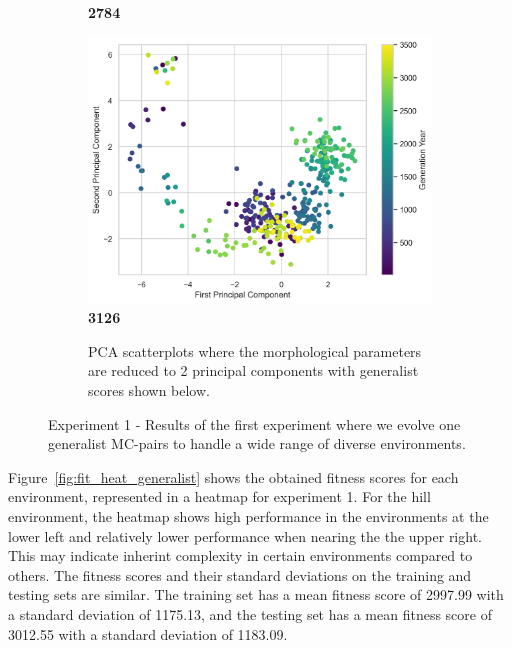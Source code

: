 \begin{figure}[!ht]
\begin{subfigure}{\textwidth}
\begin{minipage}{0.32\textwidth}
                    \textbf{2784}
                \end{minipage}
                \hfill
                \begin{minipage}{0.32\textwidth}
                    \includegraphics[width=\textwidth]{./resources/generalist_5_3126/pca_scatterplot.png}
                    \centering
                    \textbf{3126}
                \end{minipage}
                \hfill
                \caption{PCA scatterplots where the morphological parameters are reduced to 2 principal components with generalist scores shown below.}
                \label{fig:pca_generalist}
            \end{subfigure}

            \caption{Experiment 1 - Results of the first experiment where we evolve one generalist MC-pairs to handle a wide range of diverse environments.}
            \label{fig:experiment1}
        \end{figure}

        Figure~\ref{fig:fit_heat_generalist} shows the obtained fitness scores for each environment, represented in a heatmap for experiment 1. For the hill environment, the heatmap shows high performance in the environments at the lower left and relatively lower performance when nearing the the upper right. This may indicate inherint complexity in certain environments compared to others. The fitness scores and their standard deviations on the training and testing sets are similar. The training set has a mean fitness score of 2997.99 with a standard deviation of 1175.13, and the testing set has a mean fitness score of 3012.55 with a standard deviation of 1183.09. 
        
